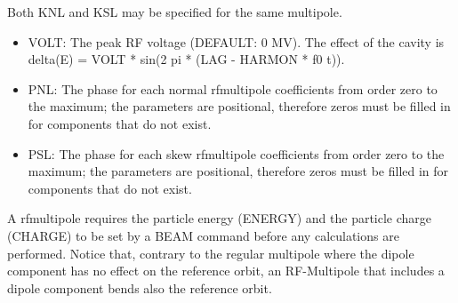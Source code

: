 Both KNL and KSL may be specified for the same multipole.  


\begin{itemize}
   \item VOLT: The peak RF voltage (DEFAULT: 0 MV). The effect of the
     cavity is \\ 
     delta(E) = VOLT * sin(2 pi * (LAG - HARMON * f0 t)). 
   \item PNL: The phase for each normal rfmultipole coefficients from
     order zero to the maximum; the parameters are positional,
     therefore zeros must be filled in for components that do not
     exist.  
   \item PSL: The phase for each skew rfmultipole coefficients from
     order zero to the maximum; the parameters are positional,
     therefore zeros must be filled in for components that do not
     exist.  
\end{itemize}       

A rfmultipole requires the particle energy (ENERGY) and the
particle charge (CHARGE) to be set by a BEAM command before any
calculations are performed. Notice that, contrary to the regular
multipole where the dipole component has no effect on the
reference orbit, an RF-Multipole that includes a dipole component
bends also the reference orbit.      


